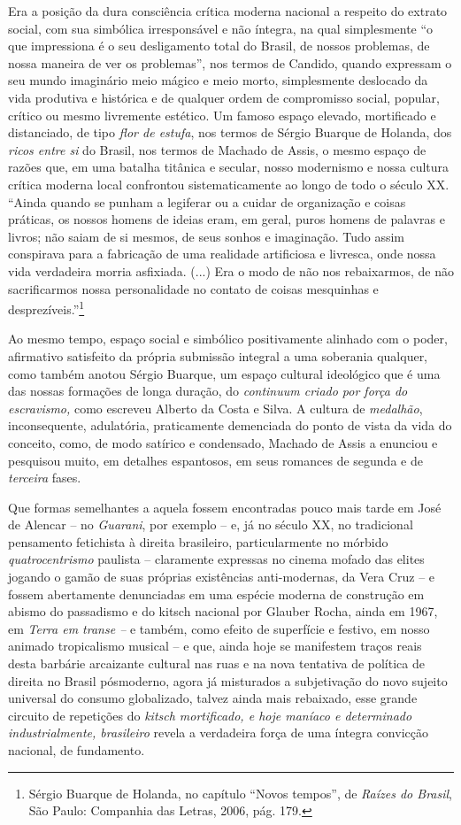 Era a posição da dura consciência crítica moderna nacional a respeito do
extrato social, com sua simbólica irresponsável e não íntegra, na qual
simplesmente ``o que impressiona é o seu desligamento total do Brasil,
de nossos problemas, de nossa maneira de ver os problemas'', nos termos
de Candido, quando expressam o seu mundo imaginário meio mágico e meio
morto, simplesmente deslocado da vida produtiva e histórica e de
qualquer ordem de compromisso social, popular, crítico ou mesmo
livremente estético. Um famoso espaço elevado, mortificado e
distanciado, de tipo \emph{flor de estufa}, nos termos de Sérgio Buarque
de Holanda, dos \emph{ricos entre si} do Brasil, nos termos de Machado
de Assis, o mesmo espaço de razões que, em uma batalha titânica e
secular, nosso modernismo e nossa cultura crítica moderna local
confrontou sistematicamente ao longo de todo o século XX. ``Ainda quando
se punham a legiferar ou a cuidar de organização e coisas práticas, os
nossos homens de ideias eram, em geral, puros homens de palavras e
livros; não saiam de si mesmos, de seus sonhos e imaginação. Tudo assim
conspirava para a fabricação de uma realidade artificiosa e livresca,
onde nossa vida verdadeira morria asfixiada. (...) Era o modo de não nos
rebaixarmos, de não sacrificarmos nossa personalidade no contato de
coisas mesquinhas e desprezíveis.''\footnote{Sérgio Buarque de Holanda,
  no capítulo ``Novos tempos'', de \emph{Raízes do Brasil}, São Paulo:
  Companhia das Letras, 2006, pág. 179.}

Ao mesmo tempo, espaço social e simbólico positivamente alinhado com o
poder, afirmativo satisfeito da própria submissão integral a uma
soberania qualquer, como também anotou Sérgio Buarque, um espaço
cultural ideológico que é uma das nossas formações de longa duração, do
\emph{continuum criado por força do escravismo,} como escreveu Alberto
da Costa e Silva. A cultura de \emph{medalhão}, inconsequente,
adulatória, praticamente demenciada do ponto de vista da vida do
conceito, como, de modo satírico e condensado, Machado de Assis a
enunciou e pesquisou muito, em detalhes espantosos, em seus romances de
segunda e de \emph{terceira} fases.

Que formas semelhantes a aquela fossem encontradas pouco mais tarde em
José de Alencar -- no \emph{Guarani}, por exemplo -- e, já no século XX,
no tradicional pensamento fetichista à direita brasileiro,
particularmente no mórbido \emph{quatrocentrismo} paulista -- claramente
expressas no cinema mofado das elites jogando o gamão de suas próprias
existências anti-modernas, da Vera Cruz -- e fossem abertamente
denunciadas em uma espécie moderna de construção em abismo do passadismo
e do kitsch nacional por Glauber Rocha, ainda em 1967, em \emph{Terra em
transe --} e também, como efeito de superfície e festivo, em nosso
animado tropicalismo musical -- e que, ainda hoje se manifestem traços
reais desta barbárie arcaizante cultural nas ruas e na nova tentativa de
política de direita no Brasil pósmoderno, agora já misturados a
subjetivação do novo sujeito universal do consumo globalizado, talvez
ainda mais rebaixado, esse grande circuito de repetições do \emph{kitsch
mortificado, e hoje maníaco e determinado industrialmente, brasileiro}
revela a verdadeira força de uma íntegra convicção nacional, de
fundamento.

